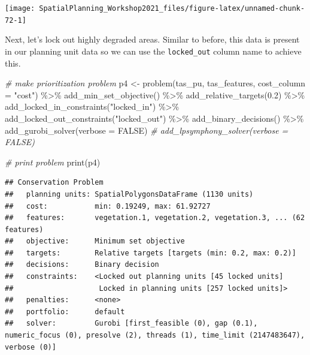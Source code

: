 \documentclass[
  12pt,
]{book}
\newenvironment{Shaded}{\begin{snugshade}}{\end{snugshade}}
\newcommand{\AttributeTok}[1]{\textcolor[rgb]{0.77,0.63,0.00}{#1}}
\newcommand{\CommentTok}[1]{\textcolor[rgb]{0.56,0.35,0.01}{\textit{#1}}}
\newcommand{\ConstantTok}[1]{\textcolor[rgb]{0.00,0.00,0.00}{#1}}
\newcommand{\FloatTok}[1]{\textcolor[rgb]{0.00,0.00,0.81}{#1}}
\newcommand{\FunctionTok}[1]{\textcolor[rgb]{0.00,0.00,0.00}{#1}}
\newcommand{\NormalTok}[1]{#1}
\newcommand{\OtherTok}[1]{\textcolor[rgb]{0.56,0.35,0.01}{#1}}
\newcommand{\SpecialCharTok}[1]{\textcolor[rgb]{0.00,0.00,0.00}{#1}}
\newcommand{\StringTok}[1]{\textcolor[rgb]{0.31,0.60,0.02}{#1}}
\begin{document}
\begin{center}\texttt{[image: SpatialPlanning\_Workshop2021\_files/figure-latex/unnamed-chunk-72-1]} \end{center}

Next, let's lock out highly degraded areas. Similar to before, this data is present in our planning unit data so we can use the \texttt{locked\_out} column name to achieve this.

\begin{Shaded}
\begin{Highlighting}[]
\CommentTok{\# make prioritization problem}
\NormalTok{p4 }\OtherTok{\textless{}{-}} \FunctionTok{problem}\NormalTok{(tas\_pu, tas\_features, }\AttributeTok{cost\_column =} \StringTok{"cost"}\NormalTok{) }\SpecialCharTok{\%\textgreater{}\%}
      \FunctionTok{add\_min\_set\_objective}\NormalTok{() }\SpecialCharTok{\%\textgreater{}\%}
      \FunctionTok{add\_relative\_targets}\NormalTok{(}\FloatTok{0.2}\NormalTok{) }\SpecialCharTok{\%\textgreater{}\%}
      \FunctionTok{add\_locked\_in\_constraints}\NormalTok{(}\StringTok{"locked\_in"}\NormalTok{) }\SpecialCharTok{\%\textgreater{}\%}
      \FunctionTok{add\_locked\_out\_constraints}\NormalTok{(}\StringTok{"locked\_out"}\NormalTok{) }\SpecialCharTok{\%\textgreater{}\%}
      \FunctionTok{add\_binary\_decisions}\NormalTok{() }\SpecialCharTok{\%\textgreater{}\%}
      \FunctionTok{add\_gurobi\_solver}\NormalTok{(}\AttributeTok{verbose =} \ConstantTok{FALSE}\NormalTok{)}
      \CommentTok{\# add\_lpsymphony\_solver(verbose = FALSE)}
\end{Highlighting}
\end{Shaded}

\begin{Shaded}
\begin{Highlighting}[]
\CommentTok{\# print problem}
\FunctionTok{print}\NormalTok{(p4)}
\end{Highlighting}
\end{Shaded}

\begin{verbatim}
## Conservation Problem
##   planning units: SpatialPolygonsDataFrame (1130 units)
##   cost:           min: 0.19249, max: 61.92727
##   features:       vegetation.1, vegetation.2, vegetation.3, ... (62 features)
##   objective:      Minimum set objective 
##   targets:        Relative targets [targets (min: 0.2, max: 0.2)]
##   decisions:      Binary decision 
##   constraints:    <Locked out planning units [45 locked units]
##                    Locked in planning units [257 locked units]>
##   penalties:      <none>
##   portfolio:      default
##   solver:         Gurobi [first_feasible (0), gap (0.1), numeric_focus (0), presolve (2), threads (1), time_limit (2147483647), verbose (0)]
\end{verbatim}
\end{document}
